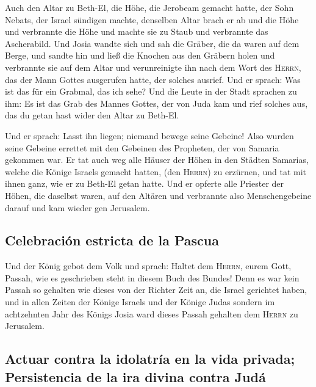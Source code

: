  Auch den Altar zu Beth-El, die Höhe, die Jerobeam
gemacht hatte, der Sohn Nebats, der Israel sündigen machte, denselben
Altar brach er ab und die Höhe und verbrannte die Höhe und machte sie zu
Staub und verbrannte das Ascherabild.  Und Josia wandte
sich und sah die Gräber, die da waren auf dem Berge, und sandte hin und
ließ die Knochen aus den Gräbern holen und verbrannte sie auf dem Altar
und verunreinigte ihn nach dem Wort des \textsc{Herrn}, das der Mann
Gottes ausgerufen hatte, der solches ausrief.  Und er
sprach: Was ist das für ein Grabmal, das ich sehe? Und die Leute in der
Stadt sprachen zu ihm: Es ist das Grab des Mannes Gottes, der von Juda
kam und rief solches aus, das du getan hast wider den Altar zu Beth-El.

 Und er sprach: Lasst ihn liegen; niemand bewege seine
Gebeine! Also wurden seine Gebeine errettet mit den Gebeinen des
Propheten, der von Samaria gekommen war.  Er tat auch weg
alle Häuser der Höhen in den Städten Samarias, welche die Könige Israels
gemacht hatten, (den \textsc{Herrn}) zu erzürnen, und tat mit ihnen
ganz, wie er zu Beth-El getan hatte.  Und er opferte alle
Priester der Höhen, die daselbst waren, auf den Altären und verbrannte
also Menschengebeine darauf und kam wieder gen Jerusalem.

\hypertarget{celebraciuxf3n-estricta-de-la-pascua}{%
\subsection{Celebración estricta de la
Pascua}\label{celebraciuxf3n-estricta-de-la-pascua}}

 Und der König gebot dem Volk und sprach: Haltet dem
\textsc{Herrn}, eurem Gott, Passah, wie es geschrieben steht in diesem
Buch des Bundes!  Denn es war kein Passah so gehalten wie
dieses von der Richter Zeit an, die Israel gerichtet haben, und in allen
Zeiten der Könige Israels und der Könige Judas  sondern
im achtzehnten Jahr des Königs Josia ward dieses Passah gehalten dem
\textsc{Herrn} zu Jerusalem.

\hypertarget{actuar-contra-la-idolatruxeda-en-la-vida-privada-persistencia-de-la-ira-divina-contra-juduxe1}{%
\subsection{Actuar contra la idolatría en la vida privada; Persistencia
de la ira divina contra
Judá}\label{actuar-contra-la-idolatruxeda-en-la-vida-privada-persistencia-de-la-ira-divina-contra-juduxe1}}

